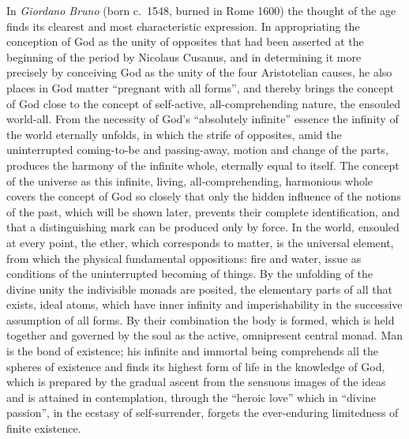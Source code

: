 In \emph{Giordano Bruno} (born c.~1548, burned in Rome 1600) the thought
of the age finds its clearest and most characteristic expression. In
appropriating the conception of God as the unity of opposites that had
been asserted at the beginning of the period by Nicolaus Cusanus, and in
determining it more precisely by conceiving God as the unity of the four
Aristotelian causes, he also places in God matter ``pregnant with all
forms'', and thereby brings the concept of God close to the concept of
self-active, all-comprehending nature, the ensouled world-all. From the
necessity of God's ``absolutely infinite'' essence the infinity of the
world eternally unfolds, in which the strife of opposites, amid the
uninterrupted coming-to-be and passing-away, motion and change of the
parts, produces the harmony of the infinite whole, eternally equal to
itself. The concept of the universe as this infinite, living,
all-comprehending, harmonious whole covers the concept of God so closely
that only the hidden influence of the notions of the past, which will be
shown later, prevents their complete identification, and that a
distinguishing mark can be produced only by force. In the world, ensouled
at every point, the ether, which corresponds to matter, is the universal
element, from which the physical fundamental oppositions: fire and water,
issue as conditions of the uninterrupted becoming of things. By the
unfolding of the divine unity the indivisible monads are posited, the
elementary parts of all that exists, ideal atoms, which have inner
infinity and imperishability in the successive assumption of
all forms. By their combination the body is formed, which is held
together and governed by the soul as the active, omnipresent central
monad. Man is the bond of existence; his infinite and immortal being
comprehends all the spheres of existence and finds its highest form of
life in the knowledge of God, which is prepared by the gradual ascent
from the sensuous images of the ideas and is attained in contemplation,
through the ``heroic love'' which in ``divine passion'', in the ecstasy
of self-surrender, forgets the ever-enduring limitedness of finite
existence.

